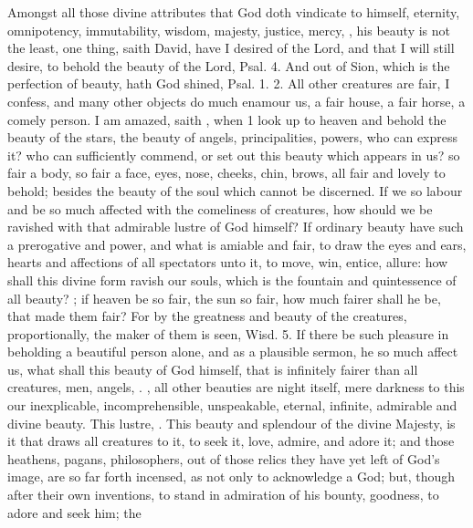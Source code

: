 {Amongst all those divine attributes that God doth vindicate to himself,
eternity, omnipotency, immutability, wisdom, majesty, justice, mercy,
\etc{}, his beauty is not the least, one thing, saith David, have I
desired of the Lord, and that I will still desire, to behold the beauty
of the Lord, Psal.  4. And out of Sion, which is the perfection
of beauty, hath God shined, Psal. 1. 2. All other creatures are fair, I
confess, and many other objects do much enamour us, a fair house, a
fair horse, a comely person. I am amazed, saith \Austin{}, when 1
look up to heaven and behold the beauty of the stars, the beauty of
angels, principalities, powers, who can express it? who can
sufficiently commend, or set out this beauty which appears in us? so
fair a body, so fair a face, eyes, nose, cheeks, chin, brows, all fair
and lovely to behold; besides the beauty of the soul which cannot be
discerned. If we so labour and be so much affected with the comeliness
of creatures, how should we be ravished with that admirable lustre of
God himself? If ordinary beauty have such a prerogative and power, and
what is amiable and fair, to draw the eyes and ears, hearts and
affections of all spectators unto it, to move, win, entice, allure: how
shall this divine form ravish our souls, which is the fountain and
quintessence of all beauty? ; if heaven be so fair, the sun so fair, how much fairer
shall he be, that made them fair? For by the greatness and beauty of
the creatures, proportionally, the maker of them is seen, Wisd. 
5. If there be such pleasure in beholding a beautiful person alone, and
as a plausible sermon, he so much affect us, what shall this beauty of
God himself, that is infinitely fairer than all creatures, men, angels,
\etc{}.  , all other beauties are night itself, mere darkness to this
our inexplicable, incomprehensible, unspeakable, eternal, infinite,
admirable and divine beauty. This lustre, . This beauty and  splendour of the divine Majesty, is
it that draws all creatures to it, to seek it, love, admire, and adore
it; and those heathens, pagans, philosophers, out of those relics they
have yet left of God's image, are so far forth incensed, as not only to
acknowledge a God; but, though after their own inventions, to stand in
admiration of his bounty, goodness, to adore and seek him; the
}
